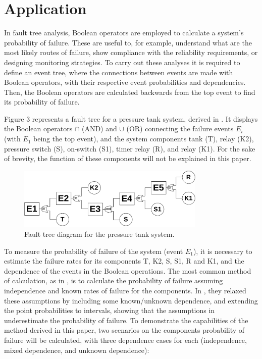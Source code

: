 \documentclass[runningheads]{llncs}
\begin{document}

\section{Application}

In fault tree analysis, Boolean operators are employed to calculate a system's probability of failure.
These are useful to, for example, understand what are the most likely routes of failure, show compliance with the reliability requirements, or designing monitoring strategies.
To carry out these analyses it is required to define an event tree, where the connections between events are made with Boolean operators, with their respective event probabilities and dependencies.
Then, the Boolean operators are calculated backwards from the top event to find its probability of failure.

Figure 3 represents a fault tree for a pressure tank system, derived in \cite{vesely1981fault,ferson2015dependence}.
It displays the Boolean operators $\cap$ (AND) and $\cup$ (OR) connecting the failure events $E_i$ (with $E_1$ being the top event), and the system components tank (T), relay (K2), pressure switch (S), on-switch (S1), timer relay (R), and relay (K1).
For the sake of brevity, the function of these components will not be explained in this paper.

\begin{figure}[!ht]
    \centering
    \includegraphics[width=0.8\textwidth]{figures/Untitled Diagram.pdf}   \caption{Fault tree diagram for the pressure tank system.}
    \label{fig:my_label}
\end{figure}

To measure the probability of failure of  the system (event $E_1$), it is necessary to estimate the failure rates for its components T, K2, S, S1, R and K1, and the dependence of the events in the Boolean operations.
The most common method of calculation, as in \cite{vesely1981fault}, is to calculate the probability of failure assuming independence and known rates of failure for the components.
In \cite{ferson2015dependence}, they relaxed these assumptions by including some known/unknown dependence, and extending the point probabilities to intervals, showing that the assumptions in \cite{vesely1981fault} underestimate the probability of failure.
To demonstrate the capabilities of the method derived in this paper, two scenarios on the components probability of failure will be calculated, with three dependence cases for each (independence, mixed dependence, and unknown dependence):
\end{document}
